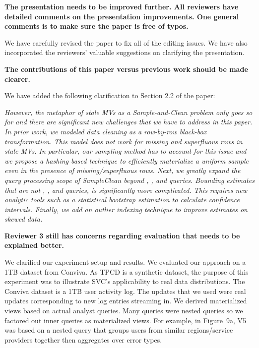 \vspace{1.5em}

\textbf{The presentation needs to be improved further. All reviewers have detailed comments on the presentation improvements. One general comments is to make sure the paper is free of typos.}

We have carefully revised the paper to fix all of the editing issues. We have also incorporated the reviewers' valuable suggestions on clarifying the presentation.

\vspace{1.5em}

\textbf{The contributions of this paper versus previous work should be made clearer.}

We have added the following clarification to Section 2.2 of the paper:

\emph{However, the metaphor of stale MVs as a Sample-and-Clean problem only goes so far and there are significant new challenges that we have to address in this paper. In prior work, we modeled data cleaning as a row-by-row black-box transformation.
This model does not work for missing and superfluous rows in stale MVs. In particular, our sampling method has to account for this issue and we propose a hashing based technique to efficiently materialize a uniform sample even in the presence of missing/superfluous rows. Next, we greatly expand the query processing scope of SampleClean beyond \sumfunc, \countfunc, and \avgfunc queries. Bounding estimates that are not \sumfunc, \countfunc, and \avgfunc queries, is significantly more complicated. This requires new analytic tools such as a statistical bootstrap estimation to calculate confidence intervals. Finally, we add an outlier indexing technique to improve estimates on skewed data.}

\vspace{1.5em}

\textbf{Reviewer 3 still has concerns regarding evaluation that needs to be explained better.}

We clarified our experiment setup and results. 
We evaluated our approach on a 1TB dataset from Conviva. 
As TPCD is a synthetic dataset, the purpose of this experiment was to illustrate SVC's applicability to real data distributions. The Conviva dataset is a 1TB user activity log. The updates that we used were real updates corresponding to new log entries streaming in. We derived materialized views based on actual analyst queries. Many queries were nested queries so we factored out inner queries as materialized views. For example, in Figure~9a, V5 was based on a nested query that groups users from similar regions/service providers together then aggregates over error types.  %

